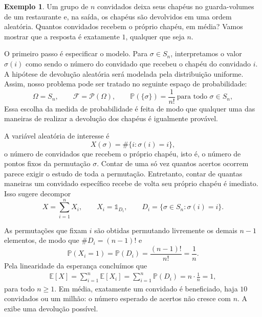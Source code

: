 \documentclass[12pt,portuguese]{article}
\theoremstyle{definition}
\newtheorem{example}[example]{Exemplo}
\begin{document}
\begin{example}\label{ex:chapeus-pontos-fixos}
Um grupo de $n$ convidados deixa seus chapéus no guarda-volumes de um
restaurante e, na saída, os chapéus são devolvidos em uma ordem aleatória.
Quantos convidados recebem o próprio chapéu, em média? Vamos mostrar que a
resposta é exatamente $1$, qualquer que seja $n$.

O primeiro passo é especificar o modelo. Para $\sigma\in S_n$, interpretamos
o valor $\sigma(i)$ como sendo o número do convidado que recebeu o chapéu do
convidado $i$. A hipótese de devolução aleatória será modelada pela distribuição
uniforme. Assim, nosso problema pode ser tratado no seguinte espaço de probabilidade:
\[
\Omega=S_n,
\qquad
\mathcal{F}=\mathscr{P}(\Omega),
\qquad
\mathbb{P}(\{\sigma\})=\frac{1}{n!}\ \text{para todo }\sigma\in S_n,
\]
Essa escolha da medida de probabilidade é feita de modo que qualquer uma das
maneiras de realizar a devolução dos chapéus é igualmente provável.

A variável aleatória de interesse é
\[
X(\sigma)=\#\{i:\sigma(i)=i\},
\]
o número de convidados que recebem o próprio chapéu, isto é, o número de
pontos fixos da permutação $\sigma$. Contar de uma só vez quantos acertos
ocorrem parece exigir o estudo de toda a permutação. Entretanto, contar 
de quantas maneiras um convidado específico recebe de volta seu próprio 
chapéu é imediato. Isso sugere decompor
\[
X=\sum_{i=1}^n X_i,
\qquad
X_i=\mathds{1}_{D_i},
\qquad
D_i=\{\sigma\in S_n:\sigma(i)=i\}.
\]

As permutações que fixam $i$ são obtidas permutando livremente os demais
$n-1$ elementos, de modo que $\#D_i=(n-1)!$ e
\[
\mathbb{P}(X_i=1)=\mathbb{P}(D_i)=\frac{(n-1)!}{n!}=\frac{1}{n}.
\]
Pela linearidade da esperança concluímos que 
\begin{align*}
\mathbb{E}[X]
=\sum_{i=1}^n\mathbb{E}[X_i]
=\sum_{i=1}^n\mathbb{P}(D_i)
=n\cdot\frac{1}{n}
=1,
\end{align*}
para todo $n\geqslant 1$. Em média, exatamente um convidado é beneficiado,
haja $10$ convidados ou um milhão: o número esperado de acertos não cresce
com $n$. A  exibe uma devolução possível.
\end{example}
\end{document}
